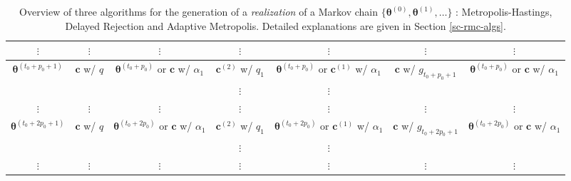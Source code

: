 \begin{sidewaystable}[h]
\begin{tabular}{|c||c|c||c|c||c|c|}
\hline
\hline
$\vdots$             & $\vdots$                & $\vdots$                                & $\vdots$               & $\vdots$                                        & $\vdots$         & $\vdots$                                \\
\hline
\hline
$\boldsymbol{\theta}^{(t_0+p_0+1)}$ & $\mathbf{c}$ w/ $q$              & $\boldsymbol{\theta}^{(t_0+p_0)}$ or $\mathbf{c}$ w/ $\alpha_1$ & $\mathbf{c}^{(2)}$ w/ $q_1$     & $\boldsymbol{\theta}^{(t_0+p_0)}$ or $\mathbf{c}^{(1)}$ w/ $\alpha_1$ & $\mathbf{c}$ w/ $g_{t_0+p_0+1}$     & $\boldsymbol{\theta}^{(t_0+p_0)}$ or $\mathbf{c}$ w/ $\alpha_1$ \\
\cline{4-5}
                     &                         &                                         & $\vdots$               & $\vdots$                                        &                  &                                         \\
\hline
\hline
$\vdots$             & $\vdots$                & $\vdots$                                & $\vdots$               & $\vdots$                                        & $\vdots$         & $\vdots$                                \\
\hline
\hline
$\boldsymbol{\theta}^{(t_0+2p_0+1)}$& $\mathbf{c}$ w/ $q$              & $\boldsymbol{\theta}^{(t_0+2p_0)}$ or $\mathbf{c}$ w/ $\alpha_1$& $\mathbf{c}^{(2)}$ w/ $q_1$     & $\boldsymbol{\theta}^{(t_0+2p_0)}$ or $\mathbf{c}^{(1)}$ w/ $\alpha_1$& $\mathbf{c}$ w/ $g_{t_0+2p_0+1}$     & $\boldsymbol{\theta}^{(t_0+2p_0)}$ or $\mathbf{c}$ w/ $\alpha_1$\\
\cline{4-5}
                     &                         &                                         & $\vdots$               & $\vdots$                                        &                  &                                         \\
\hline
\hline
$\vdots$             & $\vdots$                & $\vdots$                                & $\vdots$               & $\vdots$                                        & $\vdots$         & $\vdots$                                \\
\hline
\end{tabular}
\caption{Overview of three algorithms for the generation of a {\it realization} of a Markov chain 
$\{\boldsymbol{\theta}^{(0)},\boldsymbol{\theta}^{(1)},\ldots\}$
: Metropolis-Hastings, Delayed Rejection and Adaptive Metropolis.
Detailed explanations are given in Section \ref{sc-rmc-algs}.
}
\label{tab-dram}
\end{sidewaystable}

